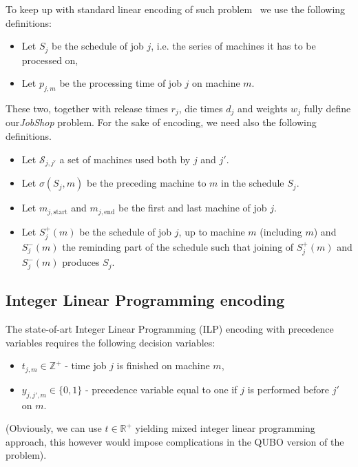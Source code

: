 \documentclass[aps,pra,amsmath,amssymb,amsfonts,lengthcheck,twocolumn,superscriptaddress]{revtex4-1}
\begin{document}
To keep up with standard linear encoding of such problem~\cite{pinedo2012scheduling} we use the following definitions: 
\begin{itemize}
\item Let $S_j$ be the schedule of job $j$, i.e. the series of machines it has to be processed on,
\item Let $p_{j,m}$ be the processing time of job $j$ on machine $m$. 
\end{itemize}
These two, together with release times $r_j$, die times $d_j$ and weights $w_j$ fully define our\emph{JobShop} problem. For the sake of encoding, we need also the following definitions.
\begin{itemize}
\item Let $\mathcal{S}_{j,j'}$ a set of machines used both by $j$ and $j'$. 
\item Let $\sigma(S_j, m)$ be the preceding machine  to $m$ in the schedule $S_j$. 
\item Let $m_{j, \text{start}}$ and $m_{j, \text{end}}$ be the first and last machine of job $j$. 
\item Let $S^+_j(m)$ be the schedule of job $j$, up to machine $m$ (including $m$) and $S^-_j(m)$ the reminding part of the schedule such that joining of $S^+_j(m)$ and $S^-_j(m)$ produces $S_j$.
\end{itemize}

\subsection{Integer Linear Programming encoding}

The state-of-art Integer Linear Programming (ILP) encoding with precedence variables requires the following decision variables:
\begin{itemize}
    \item $t_{j,m} \in \mathbb{Z}^+$ - time job $j$ is finished on machine $m$,
    \item $y_{j, j', m} \in \{0,1\}$ - precedence variable equal to one if $j$ is performed before $j'$ on $m$.
\end{itemize}
(Obviously, we can use $t \in \mathbb{R}^+$ yielding mixed integer linear programming approach, this however would impose complications in the QUBO version of the problem).
\end{document}
